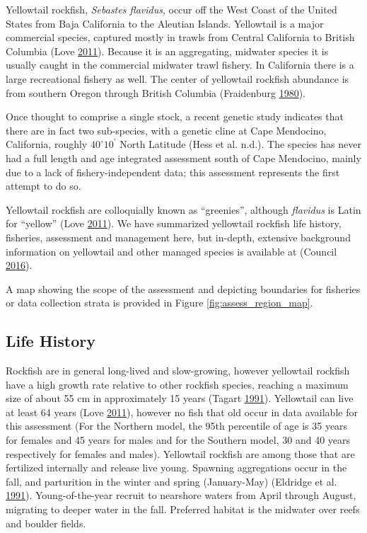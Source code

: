 \documentclass[12pt,]{article}
\begin{document}
Yellowtail rockfish, \emph{Sebastes flavidus}, occur off the West Coast
of the United States from Baja California to the Aleutian Islands.
Yellowtail is a major commercial species, captured mostly in trawls from
Central California to British Columbia (Love
\protect\hyperlink{ref-Love2011}{2011}). Because it is an aggregating,
midwater species it is usually caught in the commercial midwater trawl
fishery. In California there is a large recreational fishery as well.
The center of yellowtail rockfish abundance is from southern Oregon
through British Columbia (Fraidenburg
\protect\hyperlink{ref-Fraidenburg1980}{1980}).

Once thought to comprise a single stock, a recent genetic study
indicates that there are in fact two sub-species, with a genetic cline
at Cape Mendocino, California, roughly \(40^\circ 10^\prime\) North
Latitude (Hess et al. n.d.). The species has never had a full length and
age integrated assessment south of Cape Mendocino, mainly due to a lack
of fishery-independent data; this assessment represents the first
attempt to do so.

Yellowtail rockfish are colloquially known as ``greenies'', although
\emph{flavidus} is Latin for ``yellow'' (Love
\protect\hyperlink{ref-Love2011}{2011}). We have summarized yellowtail
rockfish life history, fisheries, assessment and management here, but
in-depth, extensive background information on yellowtail and other
managed species is available at (Council
\protect\hyperlink{ref-PFMC2016}{2016}).

A map showing the scope of the assessment and depicting boundaries for
fisheries or data collection strata is provided in Figure
\ref{fig:assess_region_map}.

\subsection{Life History}\label{life-history}

Rockfish are in general long-lived and slow-growing, however yellowtail
rockfish have a high growth rate relative to other rockfish species,
reaching a maximum size of about 55 cm in approximately 15 years (Tagart
\protect\hyperlink{ref-Tagart1991}{1991}). Yellowtail can live at least
64 years (Love \protect\hyperlink{ref-Love2011}{2011}), however no fish
that old occur in data available for this assessment (For the Northern
model, the 95th percentile of age is 35 years for females and 45 years
for males and for the Southern model, 30 and 40 years respectively for
females and males). Yellowtail rockfish are among those that are
fertilized internally and release live young. Spawning aggregations
occur in the fall, and parturition in the winter and spring
(January-May) (Eldridge et al.
\protect\hyperlink{ref-Eldridge1991}{1991}). Young-of-the-year recruit
to nearshore waters from April through August, migrating to deeper water
in the fall. Preferred habitat is the midwater over reefs and boulder
fields.
\end{document}
